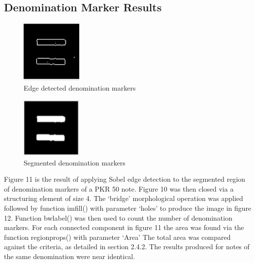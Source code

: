 \documentclass{article}
\begin{document}
\subsection{Denomination Marker Results}
\begin{figure}[h!]

\begin{minipage}[b]{1.0\linewidth}
  \centering
  \centerline{\includegraphics[width=3cm]{marker1.png}}
  \vspace{-3mm}
\end{minipage}
%
\caption{Edge detected denomination markers}
\label{fig:m1}
\vspace{-3mm}
\end{figure}

\begin{figure}[h!]

\begin{minipage}[b]{1.0\linewidth}
  \centering
  \centerline{\includegraphics[width=3cm]{marker2.png}}
  \vspace{-3mm}
\end{minipage}
%
\caption{Segmented denomination markers}
\label{fig:m2}
\vspace{-3mm}
\end{figure}

Figure 11 is the result of applying Sobel edge detection to the segmented region of denomination markers of a PKR 50 note. Figure 10 was then closed via a structuring element of size 4. The ‘bridge’ morphological operation was applied followed by function imfill() with parameter ‘holes’ to produce the image in figure 12. Function bwlabel() was then used to count the number of denomination markers. For each connected component in figure 11 the area was found via the function regionprops() with parameter ‘Area’ The total area was compared against the criteria, as detailed in section 2.4.2. The results produced for notes of the same denomination were near identical.
\end{document}
